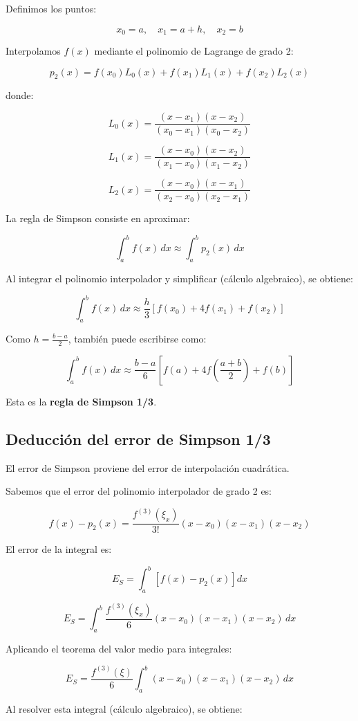 \documentclass[12pt,a4paper]{article}
\begin{document}
Definimos los puntos:

\[
x_0 = a, \quad x_1 = a+h, \quad x_2 = b
\]

Interpolamos $f(x)$ mediante el polinomio de Lagrange de grado 2:

\[
p_2(x) = f(x_0)L_0(x) + f(x_1)L_1(x) + f(x_2)L_2(x)
\]

donde:

\[
L_0(x) = \frac{(x-x_1)(x-x_2)}{(x_0-x_1)(x_0-x_2)}
\]

\[
L_1(x) = \frac{(x-x_0)(x-x_2)}{(x_1-x_0)(x_1-x_2)}
\]

\[
L_2(x) = \frac{(x-x_0)(x-x_1)}{(x_2-x_0)(x_2-x_1)}
\]

La regla de Simpson consiste en aproximar:

\[
\int_a^b f(x)\,dx \approx \int_a^b p_2(x)\,dx
\]

Al integrar el polinomio interpolador y simplificar (cálculo algebraico), se obtiene:

\[
\int_a^b f(x)\,dx \approx \frac{h}{3}\left[f(x_0) + 4f(x_1) + f(x_2)\right]
\]

Como $h = \frac{b-a}{2}$, también puede escribirse como:

\[
\int_a^b f(x)\,dx \approx \frac{b-a}{6}
\left[f(a) + 4f\left(\frac{a+b}{2}\right) + f(b)\right]
\]

Esta es la \textbf{regla de Simpson 1/3}.



\subsection{Deducción del error de Simpson 1/3}

El error de Simpson proviene del error de interpolación cuadrática.

Sabemos que el error del polinomio interpolador de grado 2 es:

\[
f(x) - p_2(x) = \frac{f^{(3)}(\xi_x)}{3!}(x-x_0)(x-x_1)(x-x_2)
\]

El error de la integral es:

\[
E_S = \int_a^b [f(x) - p_2(x)] dx
\]

\[
E_S = \int_a^b \frac{f^{(3)}(\xi_x)}{6}
(x-x_0)(x-x_1)(x-x_2)\,dx
\]

Aplicando el teorema del valor medio para integrales:

\[
E_S = \frac{f^{(3)}(\xi)}{6}
\int_a^b (x-x_0)(x-x_1)(x-x_2)\,dx
\]

Al resolver esta integral (cálculo algebraico), se obtiene:
\end{document}
